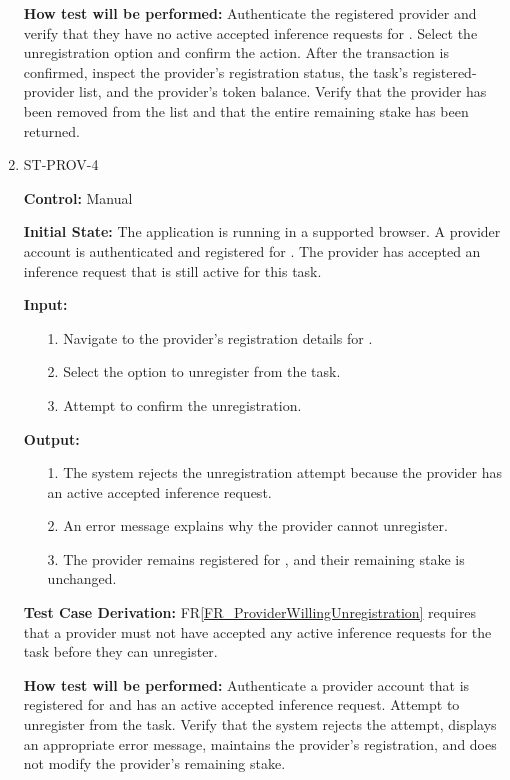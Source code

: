 \documentclass[12pt]{article}
\newcommand{\rref}[1]{FR\ref{#1}}
\newcommand{\fixture}[1]{\texttt{\seqsplit{#1}}}
\begin{document}
\begin{enumerate}
\textbf{How test will be performed:} Authenticate the registered provider and verify
that they have no active accepted inference requests for
\fixture{TASK-03}. Select the unregistration option and confirm the action.
After the transaction is confirmed, inspect the provider's registration
status, the task's registered-provider list, and the provider's token
balance. Verify that the provider has been removed from the list and that
the entire remaining stake has been returned.

\item{ST-PROV-4\\}

\textbf{Control:} Manual

\textbf{Initial State:} The application is running in a supported browser. A provider
account is authenticated and registered for \fixture{TASK-04}. The provider
has accepted an inference request that is still active for this task.

\textbf{Input:}
\begin{itemize}
\item[1.] Navigate to the provider's registration details for
\fixture{TASK-04}.
\item[2.] Select the option to unregister from the task.
\item[3.] Attempt to confirm the unregistration.
\end{itemize}

\textbf{Output:}
\begin{itemize}
\item[1.] The system rejects the unregistration attempt because the provider has
an active accepted inference request.
\item[2.] An error message explains why the provider cannot unregister.
\item[3.] The provider remains registered for \fixture{TASK-04}, and their
remaining stake is unchanged.
\end{itemize}

\textbf{Test Case Derivation:} \rref{FR_ProviderWillingUnregistration} requires that a
provider must not have accepted any active inference requests for the task
before they can unregister.

\textbf{How test will be performed:} Authenticate a provider account that is
registered for \fixture{TASK-04} and has an active accepted inference request.
Attempt to unregister from the task. Verify that the system rejects the
attempt, displays an appropriate error message, maintains the provider's
registration, and does not modify the provider's remaining stake.

\end{enumerate}
\end{document}
